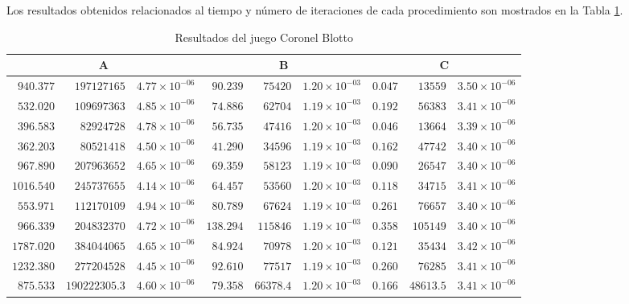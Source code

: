 Los resultados obtenidos relacionados al tiempo y número de iteraciones de cada procedimiento son mostrados en la Tabla \ref{tab:resultados-coronel-blotto}.

\begin{table}
   \scriptsize
    \centering
    \begin{tabular}{r r r | r r r | r r r}
    \multicolumn{3}{c}{A} & \multicolumn{3}{c}{B} & \multicolumn{3}{c}{C} \\ \hline
	$940.377$ & $197127165$ & $4.77 {\times} 10^{-06}$ & $90.239$ & $75420$ & $1.20 {\times} 10^{-03}$ & $0.047$ & $13559$ & $3.50 {\times} 10^{-06}$ \\
	$532.020$ & $109697363$ & $4.85 {\times} 10^{-06}$ & $74.886$ & $62704$ & $1.19 {\times} 10^{-03}$ & $0.192$ & $56383$ & $3.41 {\times} 10^{-06}$ \\
	$396.583$ & $82924728$ & $4.78 {\times} 10^{-06}$ & $56.735$ & $47416$ & $1.20 {\times} 10^{-03}$ & $0.046$ & $13664$ & $3.39 {\times} 10^{-06}$ \\
	$362.203$ & $80521418$ & $4.50 {\times} 10^{-06}$ & $41.290$ & $34596$ & $1.19 {\times} 10^{-03}$ & $0.162$ & $47742$ & $3.40 {\times} 10^{-06}$ \\
	$967.890$ & $207963652$ & $4.65 {\times} 10^{-06}$ & $69.359$ & $58123$ & $1.19 {\times} 10^{-03}$ & $0.090$ & $26547$ & $3.40 {\times} 10^{-06}$ \\
	$1016.540$ & $245737655$ & $4.14 {\times} 10^{-06}$ & $64.457$ & $53560$ & $1.20 {\times} 10^{-03}$ & $0.118$ & $34715$ & $3.41 {\times} 10^{-06}$ \\
	$553.971$ & $112170109$ & $4.94 {\times} 10^{-06}$ & $80.789$ & $67624$ & $1.19 {\times} 10^{-03}$ & $0.261$ & $76657$ & $3.40 {\times} 10^{-06}$ \\
	$966.339$ & $204832370$ & $4.72 {\times} 10^{-06}$ & $138.294$ & $115846$ & $1.19 {\times} 10^{-03}$ & $0.358$ & $105149$ & $3.40 {\times} 10^{-06}$ \\
	$1787.020$ & $384044065$ & $4.65 {\times} 10^{-06}$ & $84.924$ & $70978$ & $1.20 {\times} 10^{-03}$ & $0.121$ & $35434$ & $3.42 {\times} 10^{-06}$ \\
	$1232.380$ & $277204528$ & $4.45 {\times} 10^{-06}$ & $92.610$ & $77517$ & $1.19 {\times} 10^{-03}$ & $0.260$ & $76285$ & $3.41 {\times} 10^{-06}$ \\ \hline
	$875.533$ & $190222305.3$ & $4.60 {\times} 10^{-06}$ & $79.358$ & $66378.4$ & $1.20 {\times} 10^{-03}$ & $0.166$ & $48613.5$ & $3.41 {\times} 10^{-06}$ \\ \hline
    \end{tabular}
    \caption{Resultados del juego Coronel Blotto}
    \label{tab:resultados-coronel-blotto}
\end{table}

